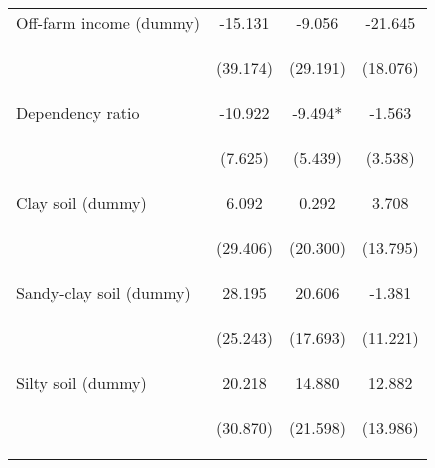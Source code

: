 \begin{center}
\begin{tabular}{lccc}
Off-farm income (dummy) & -15.131 & -9.056 & -21.645 \\
\vspace{4pt} & \begin{footnotesize}(39.174)\end{footnotesize} & \begin{footnotesize}(29.191)\end{footnotesize} & \begin{footnotesize}(18.076)\end{footnotesize} \\
Dependency ratio & -10.922 & -9.494* & -1.563 \\
\vspace{4pt} & \begin{footnotesize}(7.625)\end{footnotesize} & \begin{footnotesize}(5.439)\end{footnotesize} & \begin{footnotesize}(3.538)\end{footnotesize} \\
Clay soil (dummy) & 6.092 & 0.292 & 3.708 \\
\vspace{4pt} & \begin{footnotesize}(29.406)\end{footnotesize} & \begin{footnotesize}(20.300)\end{footnotesize} & \begin{footnotesize}(13.795)\end{footnotesize} \\
Sandy-clay soil (dummy) & 28.195 & 20.606 & -1.381 \\
\vspace{4pt} & \begin{footnotesize}(25.243)\end{footnotesize} & \begin{footnotesize}(17.693)\end{footnotesize} & \begin{footnotesize}(11.221)\end{footnotesize} \\
Silty soil (dummy) & 20.218 & 14.880 & 12.882 \\
\vspace{4pt} & \begin{footnotesize}(30.870)\end{footnotesize} & \begin{footnotesize}(21.598)\end{footnotesize} & \begin{footnotesize}(13.986)\end{footnotesize} \\

\end{tabular}
\end{center}
